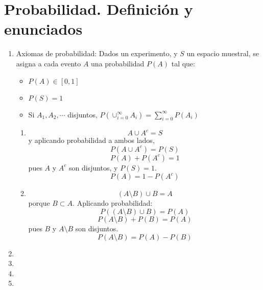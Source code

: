 \section{Probabilidad. Definición y enunciados}
\begin{enumerate}
	\item Axiomas de probabilidad: Dados un experimento, y $S$ un espacio muestral, se asigna a cada evento $A$ una probabilidad $P(A)$ tal que:
	\begin{itemize}
		\item $P(A) \in [0,1]$
		\item $P(S) = 1$
		\item Si $A_1, A_2, \cdots$ disjuntos, $P(\cup_{i=0}^{\infty} A_i) = \sum_{i=0}^{\infty}P(A_i)$
	\end{itemize}
	\begin{enumerate}
		\item
			$$A \cup A^c = S$$ y aplicando probabilidad a ambos lados,
			$$P(A \cup A^c) = P(S)$$ 
			$$P(A) + P(A^c) = 1$$ pues $A$ y $A^c$ son disjuntos, y $P(S)=1$. 
			$$P(A) = 1 - P(A^c)$$ 
		\item 
			$$(A\setminus B) \cup B = A$$ porque $B\subset A$. Aplicando probabilidad:
			$$P((A\setminus B) \cup B) = P(A)$$
			$$P(A\setminus B) + P(B) = P(A)$$ pues $B$ y $A\setminus B$ son disjuntos.
			$$P(A\setminus B)= P(A) - P(B)$$
	\end{enumerate}
	\item 
	\item 
	\item 
	\item 
\end{enumerate}
